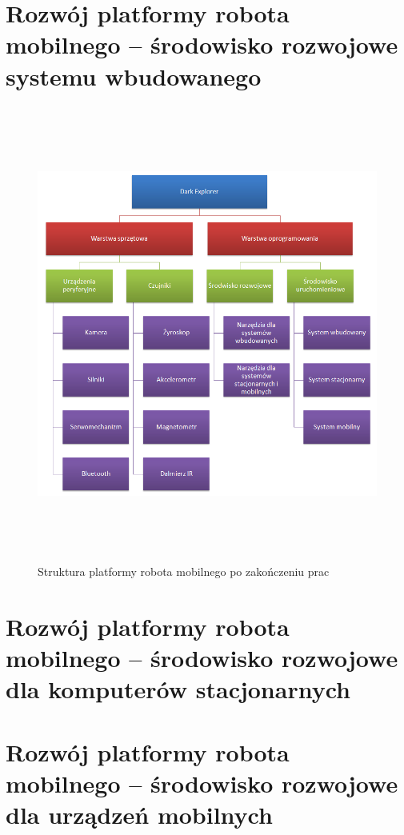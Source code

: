 \documentclass[a4paper,12pt, oneside]{mwbk}
\begin{document}
\chapter{Rozwój platformy robota mobilnego -- środowisko rozwojowe systemu wbudowanego}
\begin{figure}[!ht]
 \centering
 \includegraphics[height=150mm]{../images/ch03/darkexplorer_platform.png}
 \caption{Struktura platformy robota mobilnego po zakończeniu prac}
 \label{fig:DarkExplorerPlatform}
\end{figure}



\newpage
\chapter{Rozwój platformy robota mobilnego -- środowisko rozwojowe dla komputerów stacjonarnych}



\newpage
\chapter{Rozwój platformy robota mobilnego -- środowisko rozwojowe dla urządzeń mobilnych}


\end{document}
